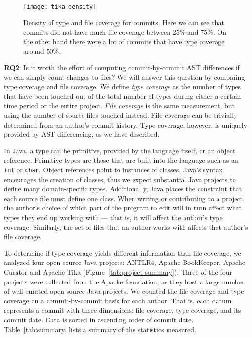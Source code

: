\begin{figure}[ht]
\centering
\texttt{[image: tika-density]}
\caption{Density of type and file coverage for commits. Here we can see that commits did not have much file coverage between 25\% and 75\%. On the other hand there were a lot of commits that have type coverage around 50\%.\label{fig:tika-density}}
\end{figure}

\textbf{RQ2}: Is it worth the effort of computing commit-by-commit AST differences if we can simply count changes to files? We will answer this question by comparing type coverage and file coverage. We define \emph{type coverage} as the number of types that have been touched out of the total number of types during either a certain time period or the entire project. \emph{File coverage} is the same measurement, but using the number of source files touched instead. File coverage can be trivially determined from an author's commit history. Type coverage, however, is uniquely provided by AST differencing, as we have described.

In Java, a type can be primitive, provided by the language itself, or an object reference. Primitive types are those that are built into the language such as an \texttt{int} or \texttt{char}. Object references point to instances of classes. Java's syntax encourages the creation of classes, thus we expect substantial Java projects to define many domain-specific types. Additionally, Java places the constraint that each source file must define one class. When writing or contributing to a project, the author's choice of which part of the program to edit will in turn affect what types they end up working with --- that is, it will affect the author's type coverage. Similarly, the set of files that an author works with affects that author's file coverage.

To determine if type coverage yields different information than file coverage, we analyzed four open source Java projects: ANTLR4, Apache BookKeeper, Apache Curator and Apache Tika (Figure~\ref{tab:project-summary}). Three of the four projects were collected from the Apache foundation, as they host a large number of well-curated open source Java projects. We counted the file coverage and type coverage on a commit-by-commit basis for each author. That is, each datum represents a commit with three dimensions: file coverage, type coverage, and its commit date. Data is sorted in ascending order of commit date. Table~\ref{tab:summary} lists a summary of the statistics measured.

